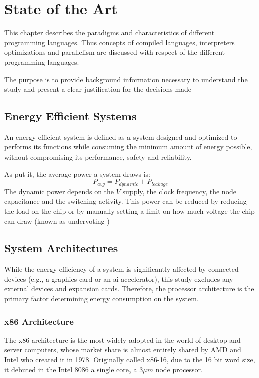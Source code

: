 \chapter{State of the Art}\label{chap:state-of-the-art}

This chapter describes the paradigms and characteristics of different programming languages. Thus concepts of compiled languages, interpreters optimizations and parallelism are discussed with respect of the different programming languages.


The purpose is to provide background information necessary to understand the study and present a clear justification for the decisions made


\section{Energy Efficient Systems}

An energy efficient system is defined as a system designed and optimized to performs its functions while consuming the minimum amount of energy possible, without compromising its performance, safety and reliability.

As \textcite{Muralidhar2020Energy} put it, the average power a system draws is:
$$P_{avg} = P_{dynamic} + P_{leakage}$$
The dynamic power depends on the $V$ supply, the clock frequency, the node capacitance and the switching activity. This power can be reduced by reducing the load on the chip or by manually setting a limit on how much voltage the chip can draw (known as undervoting \cite{undervolting-effects})


\section{System Architectures}

While the energy efficiency of a system is significantly affected by connected devices (e.g., a graphics card or an \gls{ai-accelerator}), this study excludes any external devices and expansion cards. Therefore, the processor architecture is the primary factor determining energy consumption on the system.

\subsection{x86 Architecture}
The x86 architecture is the most widely adopted in the world of desktop and server computers, whose market share is almost entirely shared by \href{https://amd.com}{AMD} and \href{https://intel.com}{Intel} who created it in 1978. Originally called x86-16, due to the 16 bit word size, it debuted in the Intel 8086 a single core, a $3 \mu m$ node processor.

